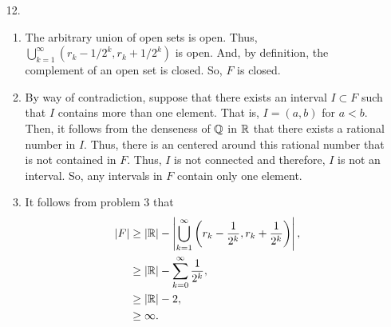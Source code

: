 \documentclass{article}
\theoremstyle{remark}
\begin{document}
\begin{enumerate}[leftmargin=*]
    \item[12.] \begin{enumerate}[label=(\alph*)]
        \item The arbitrary union of open sets is open. Thus,
        $\bigcup_{k=1}^\infty (r_k - 1/2^k, r_k + 1/2^k)$ is open. And, by
        definition, the complement of an open set is closed. So, $F$ is closed. 
        \item By way of contradiction, suppose that there exists an interval $I
        \subset F$ such that $I$ contains more than one element. That is, $I =
        (a,b)$ for $a < b$. Then, it follows from the denseness of $\mathbb{Q}$ in $\mathbb{R}$
        that there exists a rational number in $I$. Thus, there is an centered
        around this rational number that is not contained in $F$. Thus, $I$ is
        not connected and therefore, $I$ is not an interval. So, any intervals
        in $F$ contain only one element. 
        \item It follows from problem 3 that 
        \begin{align*}
            |F| &\geq |\mathbb{R}| - \left|\bigcup_{k=1}^\infty \left(r_k - \frac{1}{2^k}, r_k + \frac{1}{2^k}\right)\right|, \\
            &\geq |\mathbb{R}| - \sum_{k=0}^\infty \frac{1}{2^k}, \\
            &\geq |\mathbb{R}| - 2, \\
            &\geq \infty.
        \end{align*}
    \end{enumerate}
\end{enumerate}
\end{document}
